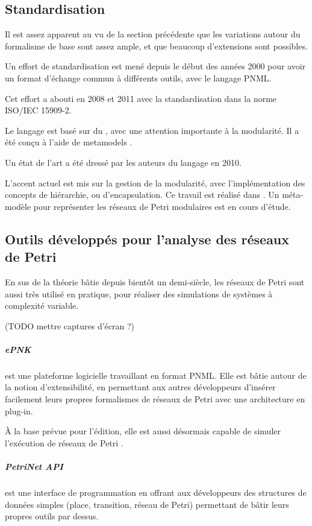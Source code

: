 \subsection{Standardisation}
Il est assez apparent au vu de la section précédente que les variations autour du formalisme de base sont assez ample, et que beaucoup d'extensions sont possibles.

Un effort de standardisation est mené depuis le début des années 2000 pour avoir un format d'échange commun à différents outils, avec le langage \ac{PNML}.

Cet effort a abouti en 2008 et 2011 avec la standardisation dans la norme ISO/IEC 15909-2.

Le langage est basé sur du , avec une attention importante à la modularité. Il a été conçu à l'aide de \glspl{metamodel} .

Un état de l'art\cite{hillah2010standardisation} a été dressé par les auteurs du langage en 2010.

L'accent actuel est mis sur la gestion de la modularité, avec l'implémentation des concepts de hiérarchie, ou d'encapsulation. Ce travail est réalisé dans . Un méta-modèle pour représenter les réseaux de Petri modulaires est en cours d'étude\cite{marechal2012modular}.

\subsection{Outils développés pour l'analyse des réseaux de Petri}
En sus de la théorie bâtie depuis bientôt un demi-siècle, les réseaux de Petri sont aussi très utilisé en pratique, pour réaliser des simulations de systèmes à complexité variable.

(TODO mettre captures d'écran ?)

\subparagraph{ePNK} est une plateforme logicielle travaillant en format \ac{PNML}. Elle est bâtie autour de la notion d'extensibilité, en permettant aux autres développeurs d'insérer facilement leurs propres formalismes de réseaux de Petri avec une architecture en plug-in.

À la base prévue pour l'édition, elle est aussi désormais capable de simuler l'exécution de réseaux de Petri  \cite{kindler2013simulator}.

\subparagraph{PetriNet API} \cite{lohmann2009petri} est une interface de programmation en  offrant aux développeurs des structures de données simples (place, transition, réseau de Petri) permettant de bâtir leurs propres outils par dessus.

